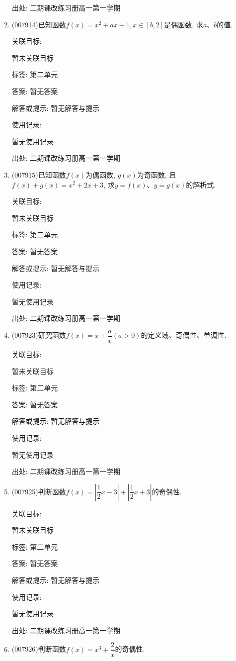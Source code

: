 \documentclass[10pt,a4paper]{article}
\begin{document}
\begin{enumerate}[1.]
出处: 二期课改练习册高一第一学期
\item { (007914)}已知函数$f(x)=x^2+ax+1,x\in [b,2]$是偶函数, 求$a$、$b$的值.


关联目标:

暂未关联目标



标签: 第二单元

答案: 暂无答案

解答或提示: 暂无解答与提示

使用记录:

暂无使用记录


出处: 二期课改练习册高一第一学期
\item { (007915)}已知函数$f(x)$为偶函数, $g(x)$为奇函数, 且$f(x)+g(x)=x^2+2x+3$, 求$y=f(x)$、$y=g(x)$的解析式.


关联目标:

暂未关联目标



标签: 第二单元

答案: 暂无答案

解答或提示: 暂无解答与提示

使用记录:

暂无使用记录


出处: 二期课改练习册高一第一学期
\item { (007923)}研究函数$f(x)=x+\dfrac ax(a>0)$的定义域、奇偶性、单调性.


关联目标:

暂未关联目标



标签: 第二单元

答案: 暂无答案

解答或提示: 暂无解答与提示

使用记录:

暂无使用记录


出处: 二期课改练习册高一第一学期
\item { (007925)}判断函数$f(x)=|\dfrac 12x-3|+|\dfrac 12x+3|$的奇偶性.


关联目标:

暂未关联目标



标签: 第二单元

答案: 暂无答案

解答或提示: 暂无解答与提示

使用记录:

暂无使用记录


出处: 二期课改练习册高一第一学期
\item { (007926)}判断函数$f(x)=x^3+\dfrac 2x$的奇偶性.



\end{enumerate}
\end{document}
